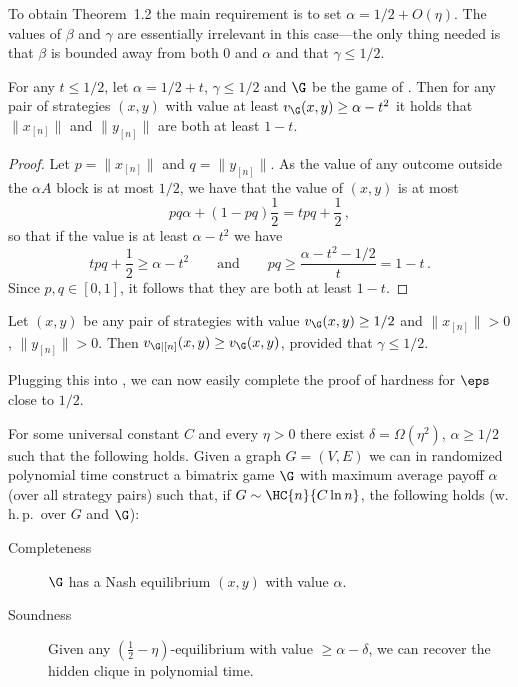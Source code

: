 To obtain Theorem~1.2 the main requirement is to
set $\alpha = {1}/{2} + O(\eta)$.  The values of $\beta$ and $\gamma$ are
essentially irrelevant in this case---the only thing needed is
that $\beta$ is bounded away from both $0$ and $\alpha$ and that $\gamma
\le {1}/{2}$.

\begin{lemma}
  \label{lem:weight-in-A}
  For any $t \le 1/2$, let $\alpha = {1}/{2} + t$, $\gamma \le {1}/{2}$ and $\G$ be the game of
  .  Then for any pair of strategies
  $(x,y)$ with value at least $v_\G(x,y) \ge \alpha - t^2$ it holds
  that $\|x_{[n]}\|$ and $\|y_{[n]}\|$ are both at least $1 - t$.
\end{lemma}

\begin{proof}
  Let $p = \|x_{[n]}\|$ and $q = \|y_{[n]}\|$.  As the value of any
  outcome outside the $\alpha A$ block is at most ${1}/{2}$, we have that
  the value of $(x,y)$ is at most
  $$pq \alpha + (1-pq) \frac{1}{2} = t pq + \frac{1}{2}\,,$$
  so that if the value is at least $\alpha - t^2$ we have
  \[
  t pq + \frac{1}{2} \ge \alpha - t^2 \qquad\text{and}\qquad
  pq \ge \frac{\alpha - t^2 - 1/2}{t} = 1-t\,.
  \]
  Since $p, q \in [0,1]$, it follows that they are both at least
  $1-t$.
%
\end{proof}

\begin{observation}
  \label{obs:value-after-condition}
  Let $(x,y)$ be any pair of strategies with value $v_{\G}(x,y) \ge
  {1}/{2}$ and $\|x_{[n]}\| > 0$, $\|y_{[n]}\| > 0$.  Then
  $v_{\G|[n]}(x,y) \ge v_{\G}(x,y)$, provided that $\gamma \le {1}/{2}$.
\end{observation}

Plugging this into , we can now easily
complete the proof of hardness for $\eps$ close to ${1}/{2}$.

\begin{theorem}
  \label{thm:eps-hardness-formal}
  For some universal constant $C$ and every $\eta>0$ there exist $\delta = \Omega(\eta^2)$, $\alpha
  \ge {1}/{2}$ such
  that the following holds.  Given a graph $G = (V,E)$ we can
  in randomized polynomial time construct a bimatrix game $\G$ with maximum average payoff $\alpha$ (over all strategy pairs) such
  that, if $G\sim\HC{n}{C\ln n}$, %
 the following holds (w.\,h.\,p.\ over $G$ and $\G$):
  \begin{description}
  \item[Completeness] %
%
    $\G$ has a Nash equilibrium
    $(x,y)$ with value $\alpha$.
  \item[Soundness]  %
%
 Given any $(\frac{1}{2}-\eta)$-equilibrium with value $\geq\alpha-\delta$, we can recover the hidden clique in polynomial time.
  \end{description}
\end{theorem}

